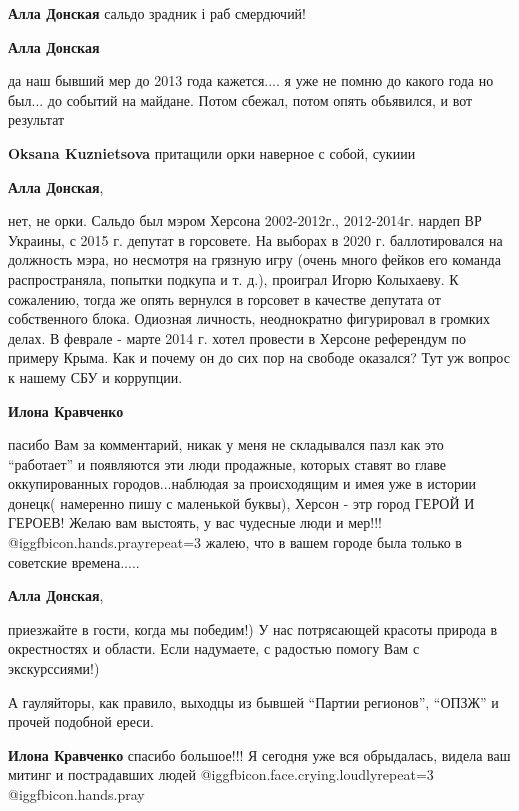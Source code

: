 \begin{itemize}
\begin{itemize}
\textbf{Алла Донская} сальдо зрадник і раб смердючий!

\textbf{Алла Донская} 

да наш бывший мер до 2013 года кажется.... я уже не помню до какого года но
был... до событий на майдане. Потом сбежал, потом опять обьявился, и вот
результат

\textbf{Oksana Kuznietsova} притащили орки наверное с собой, сукиии

\textbf{Алла Донская}, 

нет, не орки. Сальдо был мэром Херсона 2002-2012г., 2012-2014г. нардеп ВР
Украины, с 2015 г. депутат в горсовете. На выборах в 2020 г. баллотировался на
должность мэра, но несмотря на грязную игру (очень много фейков его команда
распространяла, попытки подкупа и т. д.), проиграл Игорю Колыхаеву. К
сожалению, тогда же опять вернулся в горсовет в качестве депутата от
собственного блока. Одиозная личность, неоднократно фигурировал в громких
делах. В феврале - марте 2014 г. хотел провести в Херсоне референдум по примеру
Крыма. Как и почему он до сих пор на свободе оказался? Тут уж вопрос к нашему
СБУ и коррупции.

\textbf{Илона Кравченко} 

пасибо Вам за комментарий, никак у меня не складывался пазл как это \enquote{работает}
и появляются эти люди продажные, которых ставят во главе оккупированных
городов...наблюдая за происходящим и имея уже в истории донецк( намеренно пишу
с маленькой буквы), Херсон - этр город ГЕРОЙ И ГЕРОЕВ! Желаю вам выстоять, у
вас чудесные люди и мер!!! @igg{fbicon.hands.pray}{repeat=3}  жалею, что в вашем городе была только в
советские времена.....

\textbf{Алла Донская}, 

приезжайте в гости, когда мы победим!) У нас потрясающей красоты природа в
окрестностях и области. Если надумаете, с радостью помогу Вам с экскурссиями!)

А гауляйторы, как правило, выходцы из бывшей \enquote{Партии регионов}, \enquote{ОПЗЖ} и прочей
подобной ереси.

\textbf{Илона Кравченко} спасибо большое!!! Я сегодня уже вся обрыдалась, видела ваш митинг и пострадавших людей  @igg{fbicon.face.crying.loudly}{repeat=3}  @igg{fbicon.hands.pray} 

\end{itemize} %


\end{itemize}
